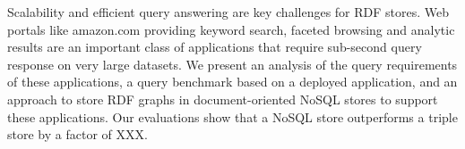 Scalability and efficient query answering are key challenges for RDF stores.
Web portals like amazon.com providing keyword search, faceted browsing and analytic results are an important class of applications that require sub-second query response on very large datasets.
We present an analysis of the query requirements of these applications, a query benchmark based on a deployed application, and an approach to store RDF graphs in document-oriented NoSQL stores to support these applications.
Our evaluations show that a NoSQL store outperforms a triple store by a factor of XXX. 
